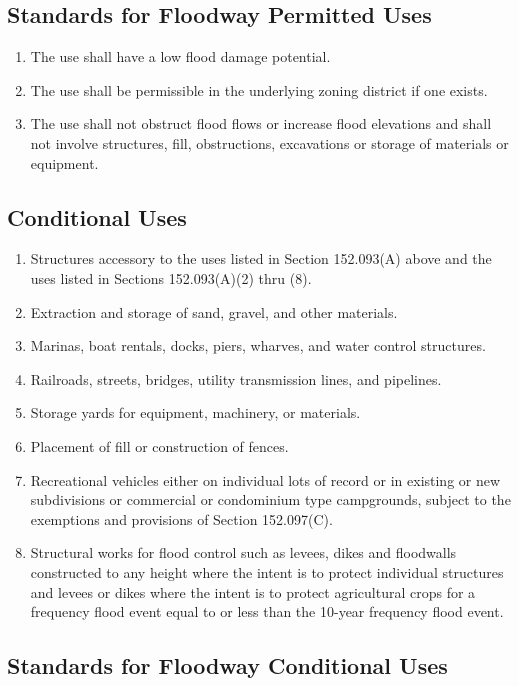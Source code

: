 \subsection{Standards for Floodway Permitted Uses}
\begin{enumerate}[{\indent}1)]
    \item The use shall have a low flood damage potential.
    \item The use shall be permissible in the underlying zoning district if one exists.
    \item The use shall not obstruct flood flows or increase flood elevations and shall not involve structures, fill, obstructions, excavations or storage of materials or equipment.
\end{enumerate}
\subsection{Conditional Uses}
\begin{enumerate}[{\indent}1)]
    \item Structures accessory to the uses listed in Section 152.093(A) above and the uses listed in Sections 152.093(A)(2) thru (8).
    \item Extraction and storage of sand, gravel, and other materials.
    \item Marinas, boat rentals, docks, piers, wharves, and water control structures.
    \item Railroads, streets, bridges, utility transmission lines, and pipelines.
    \item Storage yards for equipment, machinery, or materials.
    \item Placement of fill or construction of fences.
    \item Recreational vehicles either on individual lots of record or in existing or new subdivisions or commercial or condominium type campgrounds, subject to the exemptions and provisions of Section 152.097(C).
    \item Structural works for flood control such as levees, dikes and floodwalls constructed to any height where the intent is to protect individual structures and levees or dikes where the intent is to protect agricultural crops for a frequency flood event equal to or less than the 10-year frequency flood event.
\end{enumerate}
\subsection{Standards for Floodway Conditional Uses}
